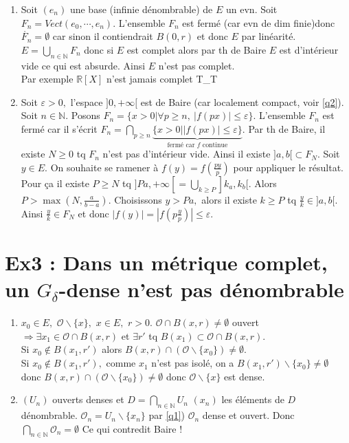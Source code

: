 \documentclass[a4paper]{article}
\begin{document}
\begin{enumerate}
    \item Soit $(e_n)$ une base (infinie dénombrable) de $E$ un evn. Soit $F_n=Vect(e_0,\cdots, e_n).$ L'ensemble $F_n$ est fermé (car evn de dim finie)donc $\mathring{F_n}=\emptyset $ car sinon il contiendrait $B(0,r)$ et donc $E$ par linéarité. $E=\bigcup\limits_{n\in \mathbb{N} } F_n$ donc si $E$ est complet alors par th de Baire $E$ est d'intérieur vide ce qui est absurde. Ainsi $E$ n'est pas complet. \\
        Par exemple $\mathbb{R} [X]$ n'est jamais complet T\_T

    \item Soit $\varepsilon >0,$ l'espace $]0,+\infty [$ est de Baire (car localement compact, voir \ref{q2}). Soit $n\in \mathbb{N} $. Posons $F_n=\{x>0|\forall p\ge n,\ |f(px)|\le \varepsilon  \} .$ L'ensemble $F_n$ est fermé car il s'écrit $F_n=\bigcap\limits_{p\ge n} \underbrace{\{x>0| |f(px)|\le \varepsilon \}}_{\text{fermé car $f$ continue}} $. Par th de Baire, il existe $N\ge 0$ tq $F_n$ n'est pas d'intérieur vide. Ainsi il existe $]a,b[\subset F_N$. Soit $y\in E.$ On souhaite se ramener à $f(y)=f(\frac{py}{p})$ pour appliquer le résultat. Pour ça il existe $P\ge N$ tq $]Pa,+\infty [ =\bigcup\limits_{k\ge P} ]k_a,k_b[$. Alors $P>\max(N,\frac{a}{b-a})$. Choisissons $y>Pa,$ alors il existe $k\ge P$ tq $\frac{y}{k}\in ]a,b[.$ Ainsi $\frac{y}{k}\in F_N$ et donc $|f(y)|=|f(p\frac{y}{p})|\le \varepsilon .$  
\end{enumerate}

\section*{Ex3 : Dans un métrique complet, un $G_\delta$-dense n'est pas dénombrable }
\begin{enumerate}
    \item\label{q1} $x_0\in E,$ $\mathcal{O}\backslash \{x\} ,$ $x\in E,$ $r>0.$ $\mathcal{O}\cap B(x,r)\neq \emptyset $ ouvert $\Rightarrow \exists x_1\in \mathcal{O}\cap B(x,r) $ et $\exists r'$ tq $B(x_1)\subset \mathcal{O}\cap B(x,r)$. \\
    Si $x_0\not\in B(x_1,r')$ alors $B(x,r)\cap (\mathcal{O}\backslash \{x_0\} )\neq \emptyset $. \\
    Si $x_0\not\in B(x_1,r'),$ comme $x_1$ n'est pas isolé, on a $B(x_1,r')\backslash \{x_0\} \neq \emptyset $ donc $B(x,r)\cap (\mathcal{O}\backslash \{x_0\}) \neq \emptyset $ donc $\mathcal{O}\backslash \{x\} $ est dense.
\item $(U_n)$ ouverts denses et $D=\bigcap\limits_{n\in \mathbb{N} } U_n$ $(x_n)$ les éléments de $D$ dénombrable. $\mathcal{O}_n=U_n\backslash \{x_{n}\} $ par \ref{q1}) $\mathcal{O}_n$ dense et ouvert. Donc $\bigcap\limits_{n\in \mathbb{N}}\mathcal{O}_n=\emptyset $ Ce qui contredit Baire !
\end{enumerate}
\end{document}
